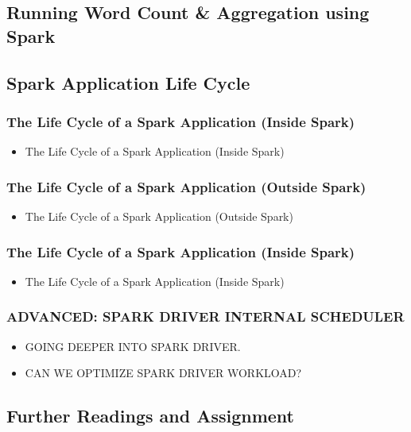 \subsection{Running Word Count \& Aggregation using Spark}\label{subsec:running-word-count-&-aggregation-using-spark}

\subsection{Spark Application Life Cycle}\label{subsec:spark-application-life-cycle}
\begin{frame}
    \frametitle{The Life Cycle of a Spark Application (Inside Spark)}
    \begin{itemize}
        \item The Life Cycle of a Spark Application (Inside Spark)
    \end{itemize}
\end{frame}
\begin{frame}
    \frametitle{The Life Cycle of a Spark Application (Outside Spark)}
    \begin{itemize}
        \item The Life Cycle of a Spark Application (Outside Spark)
    \end{itemize}
\end{frame}
\begin{frame}
    \frametitle{The Life Cycle of a Spark Application (Inside Spark)}
    \begin{itemize}
        \item The Life Cycle of a Spark Application (Inside Spark)
    \end{itemize}
\end{frame}

\begin{frame}
    \frametitle{ADVANCED: SPARK DRIVER INTERNAL SCHEDULER}
    \begin{itemize}
        \item GOING DEEPER INTO SPARK DRIVER.
        \item CAN WE OPTIMIZE SPARK DRIVER WORKLOAD?
    \end{itemize}
\end{frame}

\subsection{Further Readings and Assignment}


